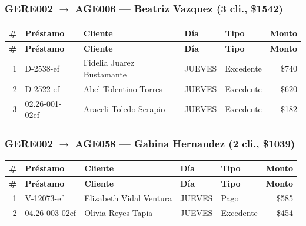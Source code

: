 \documentclass[11pt,a4paper]{article}
\newcommand{\money}[1]{\$\num{#1}}
\begin{document}
\subsubsection{GERE002 $\rightarrow$ AGE006 --- Beatriz Vazquez (3 cli., \money{1542})}


\begin{center}
\renewcommand{\arraystretch}{1.1}
\footnotesize
\begin{longtable}{rlp{5.5cm}llr}
\toprule
\textbf{\#} & \textbf{Pr\'estamo} & \textbf{Cliente} & \textbf{D\'ia} & \textbf{Tipo} & \textbf{Monto} \\
\midrule
\endfirsthead
\toprule
\textbf{\#} & \textbf{Pr\'estamo} & \textbf{Cliente} & \textbf{D\'ia} & \textbf{Tipo} & \textbf{Monto} \\
\midrule
\endhead
1 & D-2538-ef & Fidelia Juarez Bustamante & JUEVES & Excedente & \money{740} \\
2 & D-2522-ef & Abel Tolentino Torres & JUEVES & Excedente & \money{620} \\
3 & 02.26-001-02ef & Araceli Toledo Serapio & JUEVES & Excedente & \money{182} \\

\bottomrule
\end{longtable}
\end{center}
\subsubsection{GERE002 $\rightarrow$ AGE058 --- Gabina Hernandez (2 cli., \money{1039})}


\begin{center}
\renewcommand{\arraystretch}{1.1}
\footnotesize
\begin{longtable}{rlp{5.5cm}llr}
\toprule
\textbf{\#} & \textbf{Pr\'estamo} & \textbf{Cliente} & \textbf{D\'ia} & \textbf{Tipo} & \textbf{Monto} \\
\midrule
\endfirsthead
\toprule
\textbf{\#} & \textbf{Pr\'estamo} & \textbf{Cliente} & \textbf{D\'ia} & \textbf{Tipo} & \textbf{Monto} \\
\midrule
\endhead
1 & V-12073-ef & Elizabeth Vidal Ventura & JUEVES & Pago & \money{585} \\
2 & 04.26-003-02ef & Olivia Reyes Tapia & JUEVES & Excedente & \money{454} \\

\bottomrule
\end{longtable}
\end{center}
\end{document}
